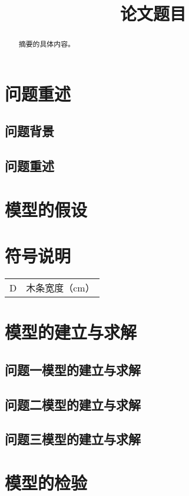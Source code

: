 \documentclass{cumcmthesis}
\title{论文题目}
\begin{document}
	\maketitle
	\begin{abstract}
		摘要的具体内容。
	\end{abstract}
	\tableofcontents
	\section{问题重述}
	\subsection{问题背景}
	\subsection{问题重述}
	\section{模型的假设}
	\section{符号说明}
	\begin{center}
		\begin{tabular}{cc}
			\hline
			\makebox[0.3\textwidth][c]{符号}	&  \makebox[0.4\textwidth][c]{意义} \\ \hline
			D	    & 木条宽度（cm） \\ \hline
		\end{tabular}
	\end{center}
	\section{模型的建立与求解}
	\subsection{问题一模型的建立与求解}
	\subsection{问题二模型的建立与求解}
	\subsection{问题三模型的建立与求解}
	\section{模型的检验}
\end{document}
